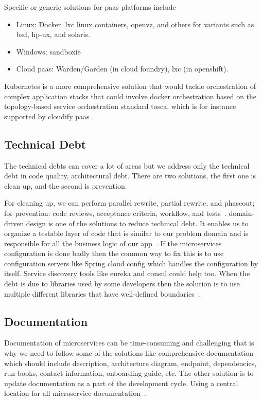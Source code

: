 Specific or generic solutions for paas platforms include 
\begin{itemize}
\item Linux: Docker, lxc linux containers, openvz, and others for variants such as bsd, hp-ux, and solaris. 
\item Windows: sandboxie 
\item Cloud paas: Warden/Garden (in cloud foundry), lxc (in openshift). 
\end{itemize}

Kubernetes is a more comprehensive solution that would tackle orchestration of complex application stacks that could involve docker orchestration based on the topology-based service orchestration standard tosca, which is for instance supported by cloudify paas \cite{Bahadori2018, Falatiuk2019, Venugopal2017 ,leo2019, Kalske2017, Zaytev2018, Kristiani2020, khan2020}. 


\subsection{Technical Debt}%
The technical debts can cover a lot of areas but we address only the technical debt in code quality, architectural debt. There are two solutions, the first one is clean up, and the second is prevention.
 
\par For cleaning up, we can perform parallel rewrite, partial rewrite, and phaseout; for prevention: code reviews, acceptance criteria, workflow, and tests~\cite{Tuuli2020}. domain-driven design is one of the solutions to reduce technical debt. 
It enables us to organize a testable layer of code that is similar to our problem domain and is responsible for all the business logic of our app~\cite{Zrzavy2020}. If the microservices configuration is done badly then the common way to fix this is to use configuration servers like Spring cloud config which handles the configuration by itself. Service discovery tools like eureka and consul could help too. When the debt is due to libraries used by some developers then the solution is to use multiple different libraries that have well-defined boundaries~\cite{Uber}. 


\subsection{Documentation}%
Documentation of microservices can be time-consuming and challenging that is why we need to follow some of the solutions like comprehensive documentation which should include description, architecture diagram, endpoint, dependencies, run books, contact information, onboarding guide, etc. The other solution is to update documentation as a part of the development cycle. Using a central location for all microservice documentation~\cite{selmadji2020}.

